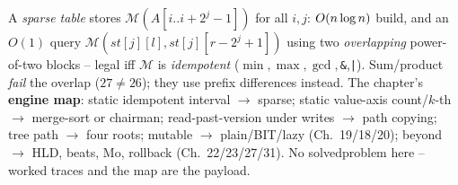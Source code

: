 \begin{recallbox}
A \emph{sparse table} stores \(\mathcal{M}(A[i..i+2^j-1])\) for all \(i,j\): \(O(n\log n)\) build, and an \(O(1)\) query \(\mathcal{M}(\mathit{st}[j][l],\mathit{st}[j][r-2^j+1])\) using two \emph{overlapping} power-of-two blocks -- legal iff \(\mathcal{M}\) is \emph{idempotent} (\(\min,\max,\gcd,\)\texttt{\&},\texttt{|}). Sum/product \emph{fail} the overlap (\(27\ne26\)); they use prefix differences instead. The chapter's \textbf{engine map}: static idempotent interval \(\to\) sparse; static value-axis count/\(k\)-th \(\to\) merge-sort or chairman; read-past-version under writes \(\to\) path copying; tree path \(\to\) four roots; mutable \(\to\) plain/BIT/lazy (Ch.~19/18/20); beyond \(\to\) HLD, beats, Mo, rollback (Ch.~22/23/27/31). No solvedproblem here -- worked traces and the map are the payload.
\end{recallbox}
